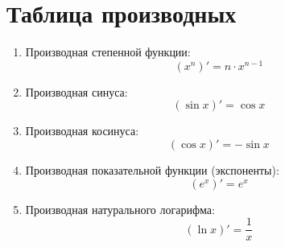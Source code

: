 \documentclass[12pt]{article}
\begin{document}
\section*{Таблица производных}

\begin{enumerate}
    \item Производная степенной функции:
    \[
    (x^n)' = n \cdot x^{n-1}
    \]
    
    \item Производная синуса:
    \[
    (\sin x)' = \cos x
    \]
    
    \item Производная косинуса:
    \[
    (\cos x)' = -\sin x
    \]
    
    \item Производная показательной функции (экспоненты):
    \[
    (e^x)' = e^x
    \]
    
    \item Производная натурального логарифма:
    \[
    (\ln x)' = \frac{1}{x}
    \]
\end{enumerate}
\end{document}
